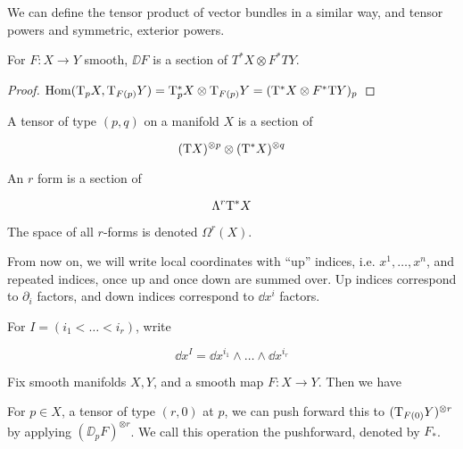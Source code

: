 \begin{remark}
    We can define the tensor product of vector bundles in a similar way, and tensor powers and symmetric, exterior powers.
\end{remark}

\begin{proposition}
    For \(F : X \to Y\) smooth, \(\DD F\) is a section of \(T^*X \otimes F^*TY\).
\end{proposition}

\begin{proof}
    \(\operatorname{Hom}(\mathrm{T}_p X, \mathrm{T}_{F(p)}Y) = \mathrm{T}_p^*X \otimes \mathrm{T}_{F(p)}Y = (\mathrm{T}^*X \otimes F^*\mathrm{T} Y)_p\)
\end{proof}

\begin{definition}
    [tensor]

    A tensor of type \((p, q)\) on a manifold \(X\) is a section of
    
    \[(\mathrm{T} X)^{\otimes p} \otimes (\mathrm{T}^* X)^{\otimes q}\]
\end{definition}

\begin{definition}

    An \(r\) form is a section of

    \[\Lambda^r\mathrm{T}^*X\]

    The space of all \(r\)-forms is denoted \(\Omega^r(X)\).
\end{definition}

From now on, we will write local coordinates with ``up'' indices, i.e. \(x^1, \dots, x^n\), and repeated indices, once up and once down are summed over. Up indices correspond to \(\partial_i\) factors, and down indices correspond to \(\dd x^i\) factors.

\begin{notation}
    For \(I = (i_1 < \dots < i_r)\), write

    \[\dd x^I = \dd x^{i_1} \wedge \dots \wedge \dd x^{i_r}\]
\end{notation}

Fix smooth manifolds \(X, Y\), and a smooth map \(F : X \to Y\). Then we have

\begin{definition}
    For \(p \in X\), a tensor of type \((r, 0)\) at \(p\), we can push forward this to \((\mathrm{T}_{F(0)}Y)^{\otimes r}\) by applying \((\DD_p F)^{\otimes r}\). We call this operation the pushforward, denoted by \(F_*\).
\end{definition}

